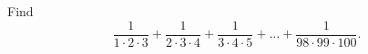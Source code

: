 Find
\[
\dfrac{1}{1\cdot2\cdot3}+\dfrac{1}{2\cdot3\cdot4}+\dfrac{1}{3\cdot4\cdot5}+\dots+\dfrac{1}{98\cdot99\cdot100}.
\]
